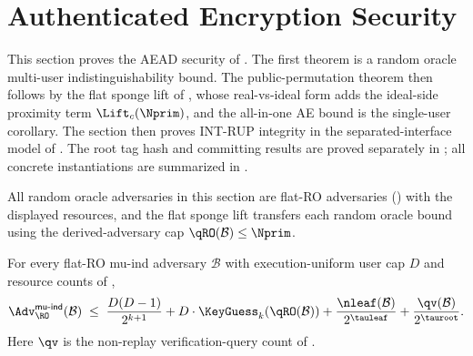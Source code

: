 \section{Authenticated Encryption Security}
\label{sec:aead-security}

This section proves the AEAD security of \TW{}. The first theorem is a
random oracle multi-user indistinguishability bound. The public-permutation
theorem then follows by the flat sponge lift of ,
whose real-vs-ideal form adds the ideal-side proximity term
$\Lift_c(\Nprim)$, and the all-in-one AE bound is the single-user corollary. The section then
proves \textsf{INT-RUP} integrity in the separated-interface model of
\cite{ABLMMY14}. The root tag hash and committing results are proved separately in
; all concrete instantiations are summarized in
.

All random oracle adversaries in this section are flat-RO adversaries
() with the displayed resources, and the flat sponge lift
transfers each random oracle bound using the derived-adversary cap
$\qRO(\mathcal{B}) \leq \Nprim$.

\begin{theorem}
\label{thm:mu-ind-ro}
For every flat-RO mu-ind adversary $\mathcal{B}$ with
execution-uniform user cap $D$ and resource counts of
,
\[
  \Adv^{\mathsf{mu\text{-}ind}}_{\RO}(\mathcal{B})
  \;\leq\;
  \frac{D(D - 1)}{2^{k + 1}}
  + D \cdot \KeyGuess_k(\qRO(\mathcal{B}))
  + \frac{\nleaf(\mathcal{B})}{2^{\tauleaf}}
  + \frac{\qv(\mathcal{B})}{2^{\tauroot}}.
\]
Here $\qv$ is the non-replay verification-query count of
.
\end{theorem}

